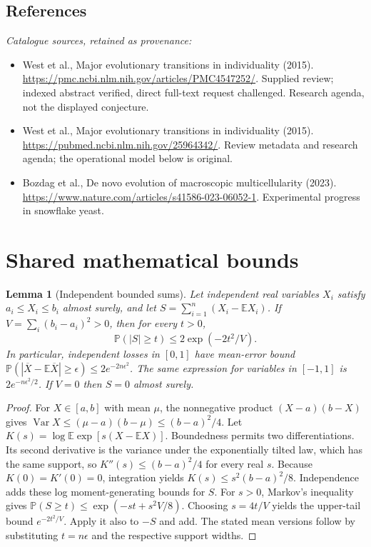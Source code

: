 \documentclass[11pt]{article}
\newcommand{\E}{\mathbb E}
\newcommand{\Prob}{\mathbb P}
\DeclareMathOperator{\Var}{Var}
\providecommand{\E}{\mathbb E}
\providecommand{\Prob}{\mathbb P}
\providecommand{\Var}{\operatorname{Var}}
\newtheorem{sharedlemma}{Lemma}[section]
\begin{document}
\subsection{References}
\noindent\emph{Catalogue sources, retained as provenance:}
\begin{itemize}
\item West et al., Major evolutionary transitions in individuality (2015). \url{https://pmc.ncbi.nlm.nih.gov/articles/PMC4547252/}. Supplied review; indexed abstract verified, direct full-text request challenged. Research agenda, not the displayed conjecture.
\item West et al., Major evolutionary transitions in individuality (2015). \url{https://pubmed.ncbi.nlm.nih.gov/25964342/}. Review metadata and research agenda; the operational model below is original.
\item Bozdag et al., De novo evolution of macroscopic multicellularity (2023). \url{https://www.nature.com/articles/s41586-023-06052-1}. Experimental progress in snowflake yeast.
\end{itemize}
\clearpage


\appendix
\section{Shared mathematical bounds}\label{app:bounds}
\begin{sharedlemma}[Independent bounded sums]\label{lem:bounded}
Let independent real variables $X_i$ satisfy $a_i\leq X_i\leq b_i$ almost surely,
and let $S=\sum_{i=1}^n(X_i-\E X_i)$. If
$V=\sum_i(b_i-a_i)^2>0$, then for every $t>0$,
\[
 \Prob(|S|\geq t)\leq 2\exp(-2t^2/V).
\]
In particular, independent losses in $[0,1]$ have mean-error bound
$\Prob(|\overline X-\E\overline X|\geq\epsilon)
\leq2e^{-2n\epsilon^2}$. The same expression for variables in $[-1,1]$
is $2e^{-n\epsilon^2/2}$. If $V=0$ then $S=0$ almost surely.
\end{sharedlemma}
\begin{proof}
For $X\in[a,b]$ with mean $\mu$, the nonnegative product
$(X-a)(b-X)$ gives
$\Var X\leq(\mu-a)(b-\mu)\leq(b-a)^2/4$.
Let $K(s)=\log\E\exp[s(X-\E X)]$.
Boundedness permits two differentiations. Its second derivative is the variance
under the exponentially tilted law, which has the same support, so
$K''(s)\leq(b-a)^2/4$ for every real $s$.
Because $K(0)=K'(0)=0$, integration yields
$K(s)\leq s^2(b-a)^2/8$.
Independence adds these log moment-generating bounds for $S$.
For $s>0$, Markov's inequality gives
$\Prob(S\geq t)\leq\exp(-st+s^2V/8)$.
Choosing $s=4t/V$ yields the upper-tail bound $e^{-2t^2/V}$.
Apply it also to $-S$ and add. The stated mean versions follow by substituting
$t=n\epsilon$ and the respective support widths.
\end{proof}
\end{document}
